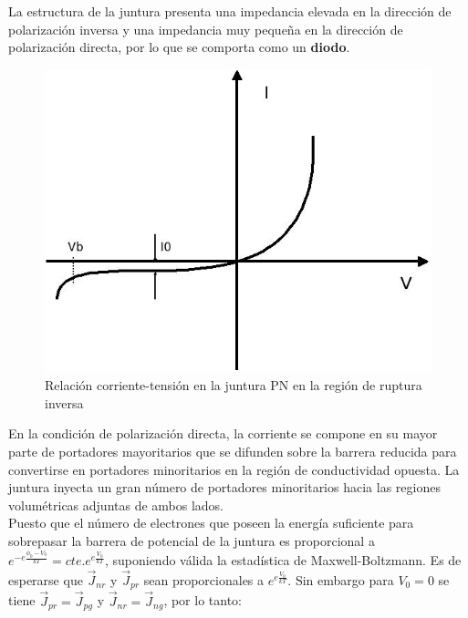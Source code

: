\documentclass[oneside]{book}
\numberwithin{equation}{section}
\numberwithin{figure}{section}
\numberwithin{table}{section}
\begin{document}
				La estructura de la juntura presenta una impedancia elevada en la dirección de polarización inversa y una impedancia muy pequeña en la dirección de polarización directa, por lo que se comporta como un \textbf{diodo}.\\
				
				\begin{figure}[H]
					\begin{center}
						\includegraphics[scale=0.5]{Diodo-PN.jpeg}
						\caption{Relación corriente-tensión en la juntura PN en la región de ruptura inversa}
					\end{center}
				\end{figure}							
				
				En la condición de polarización directa, la corriente se compone en su mayor parte de portadores mayoritarios que se difunden sobre la barrera reducida para convertirse en portadores minoritarios en la región de conductividad opuesta. La juntura inyecta un gran número de portadores minoritarios hacia las regiones volumétricas adjuntas de ambos lados.\\
				
				Puesto que el número de electrones que poseen la energía suficiente para sobrepasar la barrera de potencial de la juntura es proporcional a $\displaystyle e^{-e\frac{\phi_0-V_0}{kT}}=cte.e^{e\frac{V_0}{kT}}$, suponiendo válida la estadística de Maxwell-Boltzmann. Es de esperarse que $\vec{J}_{nr}$ y $\vec{J}_{pr}$ sean proporcionales a $\displaystyle e^{e\frac{V_0}{kT}}$. Sin embargo para $V_0=0$ se tiene $\vec{J}_{pr}=\vec{J}_{pg}$ y $\vec{J}_{nr}=\vec{J}_{ng}$, por lo tanto:\\
				
\end{document}
